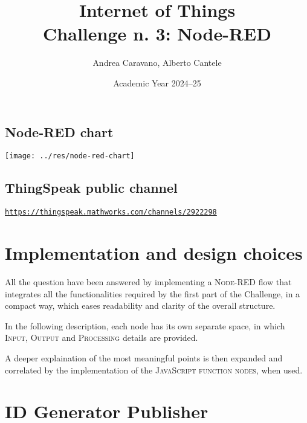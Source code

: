 \documentclass[a4paper,11pt]{article} %
\title{\textbf{Internet of Things}\\Challenge n. 3: Node-RED}
\author{Andrea Caravano, Alberto Cantele}
\date{Academic Year 2024--25}
\begin{document}
    \maketitle

    \vspace{-1em} %
    \tableofcontents

    \subsection*{Node-RED chart}
    \vspace{-0.7em} %

    \begin{center}
        \texttt{[image: ../res/node-red-chart]}
    \end{center}

    \newpage

    \subsection*{ThingSpeak public channel}

    \href{https://thingspeak.mathworks.com/channels/2922298}{\texttt{https://thingspeak.mathworks.com/channels/2922298}}


    \section{Implementation and design choices}\label{sec:implementation-and-design-choices}

    All the question have been answered by implementing a \textsc{Node-RED} flow that integrates all the functionalities required by the first part of the Challenge, in a compact way, which eases readability and clarity of the overall structure.

    In the following description, each node has its own separate space, in which \textsc{Input}, \textsc{Output} and \textsc{Processing} details are provided.

    A deeper explaination of the most meaningful points is then expanded and correlated by the implementation of the \textsc{JavaScript function nodes}, when used.


    \section{ID Generator Publisher}\label{sec:id-generator-publisher}
\end{document}

